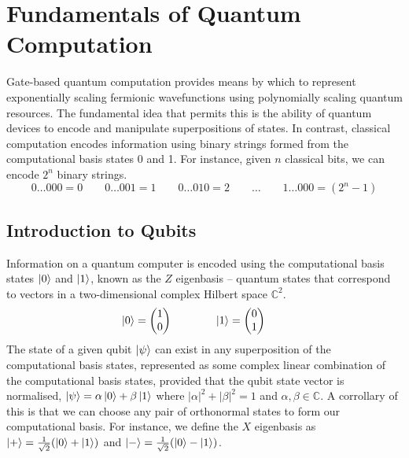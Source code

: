 \section{Fundamentals of Quantum Computation}%
\label{quantum-computation}

Gate-based quantum computation provides means by which to represent exponentially scaling fermionic wavefunctions using polynomially scaling quantum resources. The fundamental idea that permits this is the ability of quantum devices to encode and manipulate superpositions of states. In contrast, classical computation encodes information using binary strings formed from the computational basis states 0 and 1. For instance, given $n$ classical bits, we can encode $2^n$ binary strings.
\begin{equation*}
    0 \dots 000 = 0 \qquad
    0 \dots 001 = 1 \qquad
    0 \dots 010 = 2 \qquad\dots\qquad
    1 \dots 000 = (2^n - 1)
\end{equation*}

\subsection{Introduction to Qubits}

Information on a quantum computer is encoded using the computational basis states $\ket 0$ and $\ket 1$, known as the $Z$ eigenbasis -- quantum states that correspond to vectors in a two-dimensional complex Hilbert space $\mathbb{C}^2$.
\begin{equation*}
    \ket 0 = \begin{pmatrix} 1 \\ 0 \end{pmatrix} \qquad\qquad
    \ket 1 = \begin{pmatrix} 0 \\ 1 \end{pmatrix} \qquad
\end{equation*}
The state of a given qubit $\ket\psi$ can exist in any superposition of the computational basis states, represented as some complex linear combination of the computational basis states, provided that the qubit state vector is normalised, $\ket\psi = \alpha\ket 0 + \beta\ket 1$ where $|\alpha|^2 + |\beta|^2 = 1$ and $\alpha, \beta \in \mathbb{C}$. A corrollary of this is that we can choose any pair of orthonormal states to form our computational basis. For instance, we define the $X$ eigenbasis as $\ket + = \frac{1}{\sqrt 2} (\ket 0 + \ket 1)$ and $\ket - = \frac{1}{\sqrt 2} (\ket 0 - \ket 1)$.


